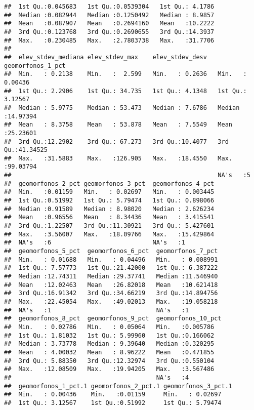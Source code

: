 \documentclass[11pt,]{article}
\begin{document}
\begin{verbatim}
##  1st Qu.:0.045683   1st Qu.:0.0539304   1st Qu.: 4.1786  
##  Median :0.082944   Median :0.1250492   Median : 8.9857  
##  Mean   :0.087907   Mean   :0.2694160   Mean   :10.2222  
##  3rd Qu.:0.123768   3rd Qu.:0.2690655   3rd Qu.:14.3937  
##  Max.   :0.230485   Max.   :2.7803738   Max.   :31.7706  
##                                                          
##  elev_stdev_mediana elev_stdev_max    elev_stdev_desv   geomorfonos_1_pct 
##  Min.   : 0.2138    Min.   :  2.599   Min.   : 0.2636   Min.   : 0.00436  
##  1st Qu.: 2.2906    1st Qu.: 34.735   1st Qu.: 4.1348   1st Qu.: 3.12567  
##  Median : 5.9775    Median : 53.473   Median : 7.6786   Median :14.97394  
##  Mean   : 8.3758    Mean   : 53.878   Mean   : 7.5549   Mean   :25.23601  
##  3rd Qu.:12.2902    3rd Qu.: 67.273   3rd Qu.:10.4077   3rd Qu.:41.34525  
##  Max.   :31.5883    Max.   :126.905   Max.   :18.4550   Max.   :99.03794  
##                                                         NA's   :5         
##  geomorfonos_2_pct geomorfonos_3_pct  geomorfonos_4_pct  
##  Min.   :0.01159   Min.   : 0.02697   Min.   : 0.003445  
##  1st Qu.:0.51992   1st Qu.: 5.79474   1st Qu.: 0.898066  
##  Median :0.91589   Median : 8.98020   Median : 2.626234  
##  Mean   :0.96556   Mean   : 8.34436   Mean   : 3.415541  
##  3rd Qu.:1.22507   3rd Qu.:11.30921   3rd Qu.: 5.427601  
##  Max.   :3.56007   Max.   :18.09766   Max.   :15.429864  
##  NA's   :6                            NA's   :1          
##  geomorfonos_5_pct  geomorfonos_6_pct  geomorfonos_7_pct  
##  Min.   : 0.01688   Min.   : 0.04496   Min.   : 0.008991  
##  1st Qu.: 7.57773   1st Qu.:21.42000   1st Qu.: 6.387222  
##  Median :12.74311   Median :29.37741   Median :11.546940  
##  Mean   :12.02463   Mean   :26.82018   Mean   :10.621418  
##  3rd Qu.:16.91342   3rd Qu.:34.66219   3rd Qu.:14.894756  
##  Max.   :22.45054   Max.   :49.02013   Max.   :19.058218  
##  NA's   :1                             NA's   :1          
##  geomorfonos_8_pct  geomorfonos_9_pct  geomorfonos_10_pct
##  Min.   : 0.02786   Min.   : 0.05064   Min.   :0.005786  
##  1st Qu.: 1.81032   1st Qu.: 5.99960   1st Qu.:0.166062  
##  Median : 3.73778   Median : 9.39640   Median :0.320295  
##  Mean   : 4.00032   Mean   : 8.96222   Mean   :0.471855  
##  3rd Qu.: 5.88350   3rd Qu.:12.32974   3rd Qu.:0.550104  
##  Max.   :12.08509   Max.   :19.94205   Max.   :3.567486  
##                                        NA's   :4         
##  geomorfonos_1_pct.1 geomorfonos_2_pct.1 geomorfonos_3_pct.1
##  Min.   : 0.00436    Min.   :0.01159     Min.   : 0.02697   
##  1st Qu.: 3.12567    1st Qu.:0.51992     1st Qu.: 5.79474   

\end{verbatim}
\end{document}
